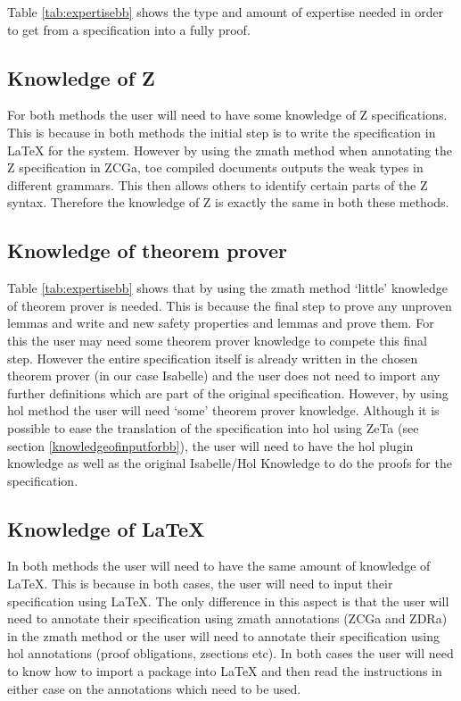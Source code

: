 Table \ref{tab:expertisebb} shows the type and amount of expertise needed in order to get from a specification into a fully proof.

\subsection{Knowledge of Z}

For both methods the user will need to have some knowledge of Z specifications. This is because in both methods the initial step is to write the specification in \LaTeX{} for the system. However by using the \gls{zmath} method when annotating the Z specification in ZCGa, toe compiled documents outputs the weak types in different grammars. This then allows others to identify certain parts of the Z syntax. Therefore the knowledge of Z is exactly the same in both these methods.

\subsection{Knowledge of theorem prover}

Table \ref{tab:expertisebb} shows that by using the \gls{zmath} method `little' knowledge of theorem prover is needed. This is because the final step to prove any unproven lemmas and write and new safety properties and lemmas and prove them. For this the user may need some theorem prover knowledge to compete this final step. However the entire specification itself is already written in the chosen theorem prover (in our case Isabelle) and the user does not need to import any further definitions which are part of the original specification. However, by using \gls{hol} method the user will need `some' theorem prover knowledge. Although it is possible to ease the translation of the specification into \gls{hol} using ZeTa (see section \ref{knowledgeofinputforbb}), the user will need to have the \gls{hol} plugin knowledge as well as the original Isabelle/Hol Knowledge to do the proofs for the specification.

\subsection{Knowledge of \LaTeX}

In both methods the user will need to have the same amount of knowledge of \LaTeX{}. This is because in both cases, the user will need to input their specification using \LaTeX{}. The only difference in this aspect is that the user will need to annotate their specification using \gls{zmath} annotations (ZCGa and ZDRa) in the \gls{zmath} method or the user will need to annotate their specification using \gls{hol} annotations (proof obligations, zsections etc). In both cases the user will need to know how to import a package into \LaTeX{} and then read the instructions in either case on the annotations which need to be used.


